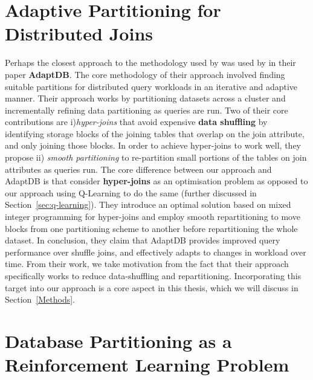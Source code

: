 
\section{Adaptive Partitioning for Distributed Joins}
Perhaps the closest approach to the methodology used by \citeauthor{Hilprecht:2019:TLP:3329859.3329876} was used by \citeauthor{DBLP:journals/pvldb/LuSJM17} in their paper \textbf{AdaptDB}. The core methodology of their approach involved finding suitable partitions for distributed query workloads in an iterative and adaptive manner. Their approach works by partitioning datasets across a cluster and incrementally refining data partitioning as queries are run. Two of their core contributions are i)\textit{hyper-joins} that avoid expensive \textbf{data shuffling} by identifying storage blocks of the joining tables that overlap on the join attribute, and only joining those blocks. In order to achieve hyper-joins to work well, they propose ii) \textit{smooth partitioning} to re-partition small portions of the tables on join attributes as queries run. 
The core difference between our approach and AdaptDB is that \citeauthor{DBLP:journals/pvldb/LuSJM17} consider \textbf{hyper-joins} as an optimisation problem as opposed to our approach using Q-Learning to do the same (further discussed in Section~\ref{sec:q-learning}). They introduce an optimal solution based on mixed integer programming for hyper-joins and employ smooth repartitioning to move blocks from one partitioning scheme to another before repartitioning the whole dataset. In conclusion, they claim that AdaptDB provides improved query performance over shuffle joins, and effectively adapts to changes in workload over time. From their work, we take motivation from the fact that their approach specifically works to reduce data-shuffling and repartitioning. Incorporating this target into our approach is a core aspect in this thesis, which we will discuss in Section~\ref{Methods}.


\section{Database Partitioning as a Reinforcement Learning Problem}
\label{db_partitioning}
